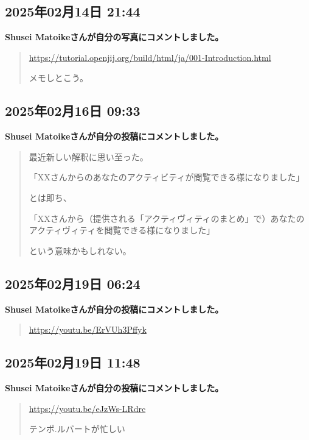 \subsection*{2025年02月14日 21:44}

\textbf{Shusei Matoikeさんが自分の写真にコメントしました。}

\begin{quote}
\url{https://tutorial.openjij.org/build/html/ja/001-Introduction.html}

メモしとこう。
\end{quote}

\subsection*{2025年02月16日 09:33}

\textbf{Shusei Matoikeさんが自分の投稿にコメントしました。}

\begin{quote}
最近新しい解釈に思い至った。

「XXさんからのあなたのアクティビティが閲覧できる様になりました」

とは即ち、

「XXさんから（提供される「アクティヴィティのまとめ」で）あなたのアクティヴィティを閲覧できる様になりました」

という意味かもしれない。
\end{quote}

\subsection*{2025年02月19日 06:24}

\textbf{Shusei Matoikeさんが自分の投稿にコメントしました。}

\begin{quote}
\url{https://youtu.be/ErVUh3Pffyk}
\end{quote}

\subsection*{2025年02月19日 11:48}

\textbf{Shusei Matoikeさんが自分の投稿にコメントしました。}

\begin{quote}
\url{https://youtu.be/eJzWs-LRdrc}

テンポ.ルバートが忙しい
\end{quote}

